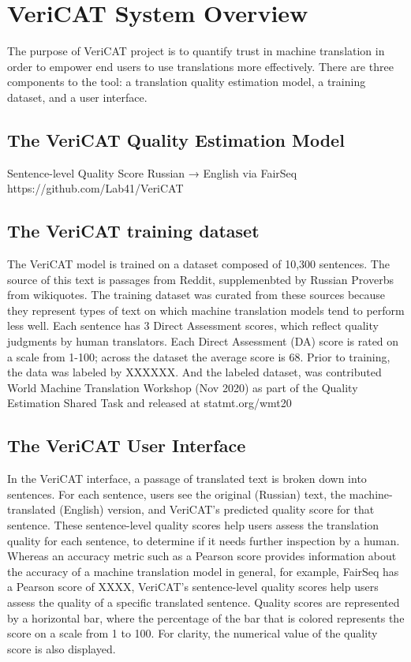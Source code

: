 \section{VeriCAT System Overview}
The purpose of VeriCAT project is to quantify trust in machine translation in order to empower end users to use translations more effectively. There are three components to the tool: a  translation quality estimation model, a training dataset, and a user interface.

\subsection{The VeriCAT Quality Estimation Model}

Sentence-level Quality Score
Russian → English via FairSeq
https://github.com/Lab41/VeriCAT

\subsection{The VeriCAT training dataset}
The VeriCAT model is trained on a dataset composed of 10,300 sentences. The source of this text is passages from Reddit, supplemenbted by Russian Proverbs from wikiquotes. The training dataset was curated from these sources because they represent types of text on which machine translation models tend to perform less well. Each sentence has 3 Direct Assessment scores, which reflect quality judgments by human translators. Each Direct Assessment (DA) score is rated on a scale from 1-100; across the dataset the average score is 68. Prior to training, the data was labeled by XXXXXX. And the labeled dataset, was contributed World Machine Translation Workshop (Nov 2020) as part of the Quality Estimation Shared Task and released at statmt.org/wmt20 

\subsection{The VeriCAT User Interface}
In the VeriCAT interface, a passage of translated text is broken down into sentences. For each sentence, users see the original (Russian) text, the machine-translated (English) version, and VeriCAT’s predicted quality score for that sentence. These sentence-level quality scores help users assess the translation quality for each sentence, to determine if it needs further inspection by a human. Whereas an accuracy metric such as a Pearson score provides information about the accuracy of a machine translation model in general, for example, FairSeq has a Pearson score of XXXX, VeriCAT’s sentence-level quality scores help users assess the quality of a specific translated sentence. Quality scores are represented by a horizontal bar, where the percentage of the bar that is colored represents the score on a scale from 1 to 100. For clarity, the numerical value of the quality score is also displayed. 

